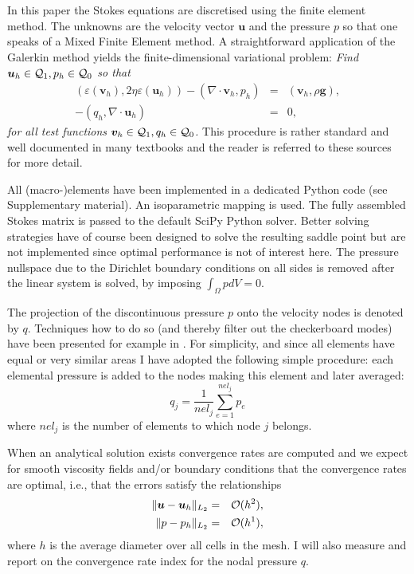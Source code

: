 \documentclass[a4paper,12pt]{article}
\begin{document}
In this paper the Stokes equations are discretised using the finite element method.
The unknowns are the velocity vector ${\bm u}$ and the pressure $p$ so that 
one speaks of a Mixed Finite Element method. 
A straightforward application of the Galerkin method yields the finite-dimensional 
variational problem: 
\textit{Find ${\bm u}_h\in {\cal Q}_1,p_h\in {\cal Q}_0$
so that
\begin{eqnarray}
\label{eq:discrete-formulation}
\left(\varepsilon(\bm v_h), 2\eta \varepsilon(\bm u_h)\right)  
- ( \nabla \cdot \bm v_h, p_h) &=&   ({\bm v}_h,\rho \bm g),\\
-(q_h,\nabla \cdot \bm u_h) &=& 0,
\end{eqnarray}
for all test functions ${\bm v}_h\in {\cal Q}_1, q_h\in {\cal Q}_0$.}
This procedure is rather standard and well documented in many 
textbooks \cite{grsa,dohu03,bobf13} and the reader is referred to these sources 
for more detail.

All (macro-)elements have been implemented in a dedicated Python code (see Supplementary material). 
An isoparametric mapping is used. 
The fully assembled Stokes matrix is passed to the default SciPy Python solver. 
Better solving strategies have of course 
been designed to solve the resulting saddle point \cite{begl05} but are not 
implemented since optimal performance is not of interest here.
The pressure nullspace due to the Dirichlet boundary conditions on all sides is removed 
after the linear system is solved, by imposing $\int_\Omega p dV= 0$.

The projection of the discontinuous pressure $p$ onto the velocity nodes is denoted by $q$. 
Techniques how to do so (and thereby filter out the checkerboard modes) have been presented 
for example in \cite{legs79,sagl81a,chpc95,thfb08}.
For simplicity, and since all elements have equal or very similar areas 
I have adopted the following simple procedure: each 
elemental pressure is added to the nodes making this element and later averaged:
\[
q_j = \frac{1}{nel_j} \sum_{e=1}^{nel_j} p_e
\]
where $nel_j$ is the number of elements to which node $j$ belongs.

When an analytical solution exists convergence rates are computed and 
we expect for smooth viscosity fields and/or boundary conditions that the convergence rates 
are optimal, i.e., that the errors satisfy the relationships
\begin{eqnarray}
\| {\bm u} - {\bm u}_h \|_{L_2} &=&  {\cal O}(h^{2}),     \\  
\| p - p_h \|_{L_2}   &=& {\cal O}(h^{1}),
  \label{eq:error-rates}
\end{eqnarray}
where $h$ is the average diameter over all cells in the mesh.
I will also measure and report on the convergence rate index for the nodal pressure $q$.
\end{document}
